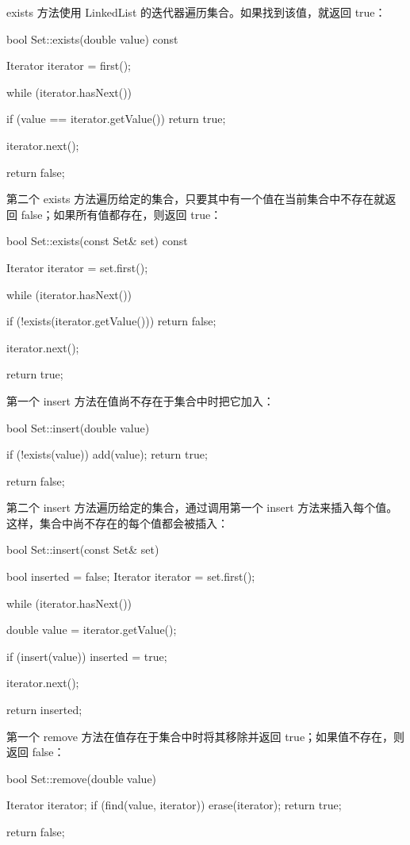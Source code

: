 exists 方法使用 LinkedList 的迭代器遍历集合。如果找到该值，就返回 true：

\begin{codebox}
bool Set::exists(double value) const {
  Iterator iterator = first();

  while (iterator.hasNext()) {
    if (value == iterator.getValue()) {
      return true;
    }

    iterator.next();
  }

  return false;
}
\end{codebox}

第二个 exists 方法遍历给定的集合，只要其中有一个值在当前集合中不存在就返回 false；如果所有值都存在，则返回 true：

\begin{codebox}
bool Set::exists(const Set& set) const {
  Iterator iterator = set.first();

  while (iterator.hasNext()) {
    if (!exists(iterator.getValue())) {
      return false;
    }

    iterator.next();
  }

  return true;
}
\end{codebox}

第一个 insert 方法在值尚不存在于集合中时把它加入：

\begin{codebox}
bool Set::insert(double value) {
  if (!exists(value)) {
    add(value);
    return true;
  }

  return false;
}
\end{codebox}

第二个 insert 方法遍历给定的集合，通过调用第一个 insert 方法来插入每个值。这样，集合中尚不存在的每个值都会被插入：

\begin{codebox}
bool Set::insert(const Set& set) {
  bool inserted = false;
  Iterator iterator = set.first();

  while (iterator.hasNext()) {
    double value = iterator.getValue();

    if (insert(value)) {
      inserted = true;
    }

    iterator.next();
  }

  return inserted;
}
\end{codebox}

第一个 remove 方法在值存在于集合中时将其移除并返回 true；如果值不存在，则返回 false：

\begin{codebox}
bool Set::remove(double value) {
  Iterator iterator;
  if (find(value, iterator)) {
    erase(iterator);
    return true;
  }

  return false;
}
\end{codebox}

